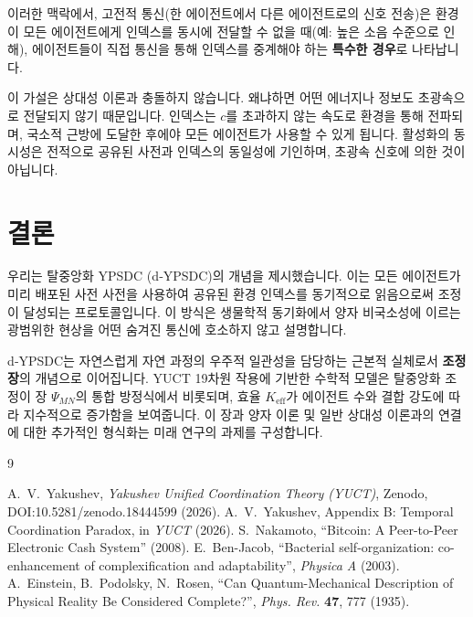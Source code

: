 \documentclass[11pt,a4paper]{article}
\begin{document}
	이러한 맥락에서, 고전적 통신(한 에이전트에서 다른 에이전트로의 신호 전송)은 환경이 모든 에이전트에게 인덱스를 동시에 전달할 수 없을 때(예: 높은 소음 수준으로 인해), 에이전트들이 직접 통신을 통해 인덱스를 중계해야 하는 \textbf{특수한 경우}로 나타납니다.
	
	이 가설은 상대성 이론과 충돌하지 않습니다. 왜냐하면 어떤 에너지나 정보도 초광속으로 전달되지 않기 때문입니다. 인덱스는 \(c\)를 초과하지 않는 속도로 환경을 통해 전파되며, 국소적 근방에 도달한 후에야 모든 에이전트가 사용할 수 있게 됩니다. 활성화의 동시성은 전적으로 공유된 사전과 인덱스의 동일성에 기인하며, 초광속 신호에 의한 것이 아닙니다.
	
	\section{결론}
	
	우리는 탈중앙화 YPSDC (d‑YPSDC)의 개념을 제시했습니다. 이는 모든 에이전트가 미리 배포된 사전 사전을 사용하여 공유된 환경 인덱스를 동기적으로 읽음으로써 조정이 달성되는 프로토콜입니다. 이 방식은 생물학적 동기화에서 양자 비국소성에 이르는 광범위한 현상을 어떤 숨겨진 통신에 호소하지 않고 설명합니다.
	
	d‑YPSDC는 자연스럽게 자연 과정의 우주적 일관성을 담당하는 근본적 실체로서 \textbf{조정장}의 개념으로 이어집니다. YUCT 19차원 작용에 기반한 수학적 모델은 탈중앙화 조정이 장 \(\Psi_{MN}\)의 통합 방정식에서 비롯되며, 효율 \(K_{\mathrm{eff}}\)가 에이전트 수와 결합 강도에 따라 지수적으로 증가함을 보여줍니다. 이 장과 양자 이론 및 일반 상대성 이론과의 연결에 대한 추가적인 형식화는 미래 연구의 과제를 구성합니다.
	
	\begin{thebibliography}{9}
		\begin{otherlanguage}{english}
			 A.~V.~Yakushev, \emph{Yakushev Unified Coordination Theory (YUCT)}, Zenodo, DOI:10.5281/zenodo.18444599 (2026).
			 A.~V.~Yakushev, Appendix B: Temporal Coordination Paradox, in \emph{YUCT} (2026).
			 S.~Nakamoto, ``Bitcoin: A Peer-to-Peer Electronic Cash System'' (2008).
			 E.~Ben-Jacob, ``Bacterial self-organization: co-enhancement of complexification and adaptability'', \emph{Physica A} (2003).
			 A.~Einstein, B.~Podolsky, N.~Rosen, ``Can Quantum-Mechanical Description of Physical Reality Be Considered Complete?'', \emph{Phys. Rev.} \textbf{47}, 777 (1935).
		\end{otherlanguage}
	\end{thebibliography}
	
\end{document}
